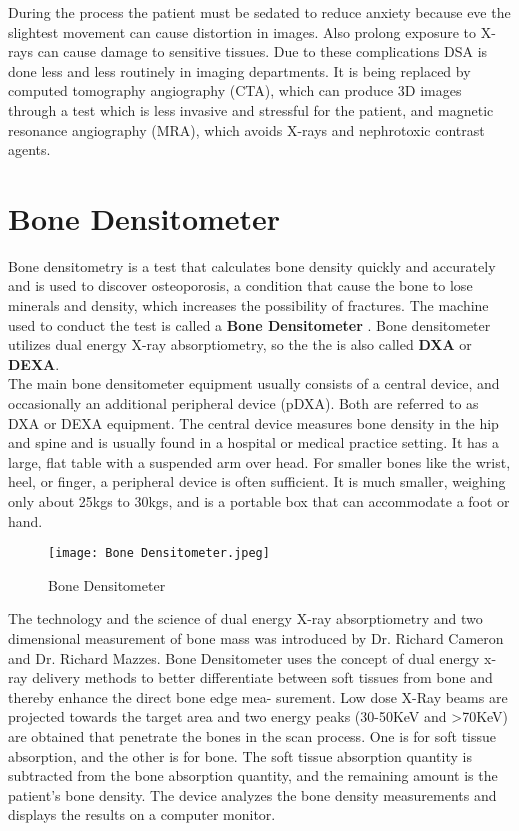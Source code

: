 \documentclass[12pt]{article}
\begin{document}
During the process the patient must be sedated to reduce anxiety because eve the slightest movement can cause distortion in images. Also prolong exposure to X-rays can cause damage to sensitive tissues. Due to these complications DSA is done less and less routinely in imaging departments. It is being replaced by computed tomography angiography (CTA), which can produce 3D images through a test which is less invasive and stressful for the patient, and magnetic resonance angiography (MRA), which avoids X-rays and nephrotoxic contrast agents.



\clearpage

\section{Bone Densitometer}

Bone densitometry is a test that calculates bone density quickly and accurately and is used to discover osteoporosis, a condition that cause the bone to lose minerals and density, which increases the possibility of fractures. The machine used to conduct the test is called a \textbf{Bone Densitometer} . Bone densitometer utilizes dual energy X-ray absorptiometry, so the the is also called \textbf{DXA} or \textbf{DEXA}.\\

The main bone densitometer equipment usually consists of a central device, and occasionally an additional peripheral device (pDXA). Both are referred to as DXA or DEXA equipment. The central device measures bone density in the hip and spine and is usually found in a hospital or medical practice setting. It has a large, flat table with a suspended arm over head. For smaller bones like the wrist, heel, or finger, a peripheral device is often sufficient. It is much smaller, weighing only about 25kgs to 30kgs, and is a portable box that can accommodate a foot or hand.\\

\begin{figure}[h]
\centering
\texttt{[image: Bone Densitometer.jpeg]}
\caption{Bone Densitometer}
\end{figure}

The technology and the science of dual energy X-ray absorptiometry and two dimensional measurement of bone mass was introduced by Dr. Richard Cameron and Dr. Richard Mazzes. Bone Densitometer uses the concept of dual energy x-ray delivery methods to better differentiate between soft tissues from bone and thereby enhance the direct bone edge mea- surement. Low dose X-Ray beams are projected towards the target area and two energy peaks (30-50KeV and >70KeV) are obtained that penetrate the bones in the scan process. One is for soft tissue absorption, and the other is for bone. The soft tissue absorption quantity is subtracted from the bone absorption quantity, and the remaining amount is the patient’s bone density. The device  analyzes the bone density measurements and displays the results on a computer monitor. \\
\end{document}
